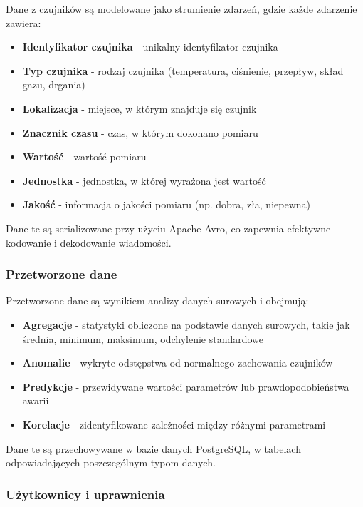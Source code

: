 Dane z czujników są modelowane jako strumienie zdarzeń, gdzie każde zdarzenie zawiera:

\begin{itemize}
    \item \textbf{Identyfikator czujnika} - unikalny identyfikator czujnika
    \item \textbf{Typ czujnika} - rodzaj czujnika (temperatura, ciśnienie, przepływ, skład gazu, drgania)
    \item \textbf{Lokalizacja} - miejsce, w którym znajduje się czujnik
    \item \textbf{Znacznik czasu} - czas, w którym dokonano pomiaru
    \item \textbf{Wartość} - wartość pomiaru
    \item \textbf{Jednostka} - jednostka, w której wyrażona jest wartość
    \item \textbf{Jakość} - informacja o jakości pomiaru (np. dobra, zła, niepewna)
\end{itemize}

Dane te są serializowane przy użyciu Apache Avro, co zapewnia efektywne kodowanie i dekodowanie wiadomości.

\subsubsection{Przetworzone dane}
\label{subsubsec:przetworzone_dane}

Przetworzone dane są wynikiem analizy danych surowych i obejmują:

\begin{itemize}
    \item \textbf{Agregacje} - statystyki obliczone na podstawie danych surowych, takie jak średnia, minimum, maksimum, odchylenie standardowe
    \item \textbf{Anomalie} - wykryte odstępstwa od normalnego zachowania czujników
    \item \textbf{Predykcje} - przewidywane wartości parametrów lub prawdopodobieństwa awarii
    \item \textbf{Korelacje} - zidentyfikowane zależności między różnymi parametrami
\end{itemize}

Dane te są przechowywane w bazie danych PostgreSQL, w tabelach odpowiadających poszczególnym typom danych.

\subsubsection{Użytkownicy i uprawnienia}
\label{subsubsec:uzytkownicy}

